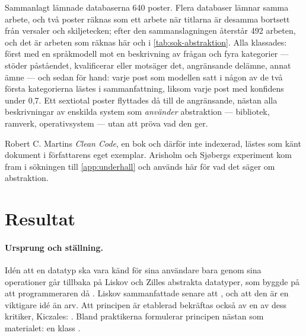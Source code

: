 Sammanlagt lämnade databaserna 640 poster.  Flera databaser lämnar
samma arbete, och två poster räknas som ett arbete när titlarna är
desamma bortsett från versaler och skiljetecken; efter den
sammanslagningen återstår 492 arbeten, och det är arbeten som räknas här
och i \cref{tab:sok-abstraktion}.  Alla klassades: först med en
språkmodell mot en beskrivning av frågan och fyra kategorier --- stöder
påståendet, kvalificerar eller motsäger det, angränsande delämne, annat
ämne --- och sedan för hand: varje post som modellen satt i någon av de
två första kategorierna lästes i sammanfattning, liksom varje post med
konfidens under 0,7.  Ett sextiotal poster flyttades då till de
angränsande, nästan alla beskrivningar av enskilda system som
\emph{använder} abstraktion --- bibliotek, ramverk, operativsystem ---
utan att pröva vad den ger.

Robert C. Martins \emph{Clean Code}\autocite{Martin2008CleanCode}, en
bok och därför inte indexerad, lästes som känt dokument i författarens
eget exemplar.  Arisholm och Sjøbergs experiment\autocite{ArisholmSjoberg2004}
kom fram i sökningen till \cref{app:underhall} och används här för vad
det säger om abstraktion.

\section{Resultat}
\label{sec:abs-resultat}

\paragraph{Ursprung och ställning.}  Idén att en datatyp ska vara känd
för sina användare bara genom sina operationer går tillbaka på Liskov
och Zilles abstrakta datatyper\autocite{LiskovZilles1974}, som byggde på
att programmeraren då .  Liskov sammanfattade senare att
, och
att den är en viktigare idé än arv.  Att principen är etablerad
bekräftas också av en av dess kritiker, Kiczales:
.  Bland
praktikerna formulerar \textcite{Martin2008CleanCode} principen nästan
som materialet: en klass .


